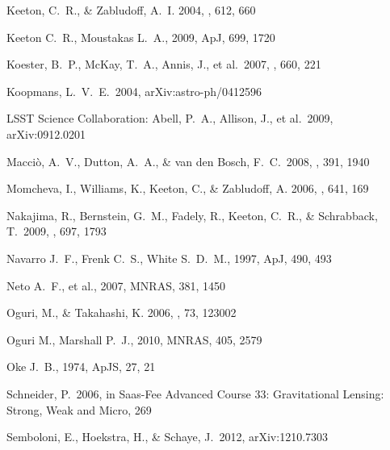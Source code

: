 \begin{thebibliography}{99}
{Keeton}, C.~R., \& {Zabludoff}, A.~I. 2004, \apj, 612, 660

 Keeton C.~R., Moustakas L.~A., 2009, ApJ, 699, 1720 


 Koester, B.~P., McKay, 
T.~A., Annis, J., et al.\ 2007, \apj, 660, 221 

 Koopmans, L.~V.~E.\ 2004, 
arXiv:astro-ph/0412596 

 LSST 
Science Collaboration: Abell, P.~A., Allison, J., et al.\ 2009, 
arXiv:0912.0201 

 Macci{\`o}, A.~V., 
Dutton, A.~A., \& van den Bosch, F.~C.\ 2008, \mnras, 391, 1940 



{Momcheva}, I., {Williams}, K., {Keeton}, C., \& {Zabludoff}, A. 2006, \apj,
  641, 169

 Nakajima, R., 
Bernstein, G.~M., Fadely, R., Keeton, C.~R., 
\& Schrabback, T.\ 2009, \apj, 697, 1793 

 Navarro J.~F., Frenk C.~S., White S.~D.~M., 1997, ApJ, 490, 493 


Neto A.~F., et al., 2007, MNRAS, 381, 1450 


{Oguri}, M., \& {Takahashi}, K. 2006, \prd, 73, 123002

 Oguri M., Marshall P.~J., 2010, MNRAS, 405, 2579 


 Oke 
J.~B., 1974, ApJS, 27, 21 

 Schneider, P.\ 2006, 
in Saas-Fee Advanced Course 33: Gravitational Lensing: Strong, Weak and Micro, 
269 

 Semboloni, E., 
Hoekstra, H., \& Schaye, J.\ 2012, arXiv:1210.7303 



\end{thebibliography}
